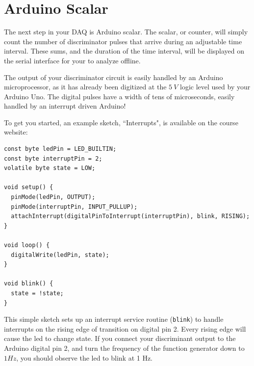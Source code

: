\documentclass[12pt]{article}
\begin{document}
\section{Arduino Scalar}

The next step in your DAQ is Arduino scalar.  The scalar, or counter, will simply count the number of discriminator pulses that arrive during an adjustable time interval.  These sums, and the duration of the time interval, will be displayed on the serial interface for your to analyze offline.

The output of your discriminator circuit is easily handled by an Arduino microprocessor, as it has already been digitized at the $5~V$ logic level used by your Arduino Uno.  The digital pulses have a width of tens of microseconds, easily handled by an interrupt driven Arduino!

To get you started, an example sketch, ``Interrupts", is available on the course website:

\begin{verbatim}
const byte ledPin = LED_BUILTIN;
const byte interruptPin = 2;
volatile byte state = LOW;

void setup() {
  pinMode(ledPin, OUTPUT);
  pinMode(interruptPin, INPUT_PULLUP);
  attachInterrupt(digitalPinToInterrupt(interruptPin), blink, RISING);
}

void loop() {
  digitalWrite(ledPin, state);
}

void blink() {
  state = !state;
}
\end{verbatim}

This simple sketch sets up an interrupt service routine ({\tt blink}) to handle interrupts on the rising edge of transition on digital pin 2.  Every rising edge will cause the led to change state.  If you connect your discriminant output to the Arduino digital pin 2, and turn the frequency of the function generator down to $1 Hz$, you should observe the led to blink at 1 Hz.
\end{document}
